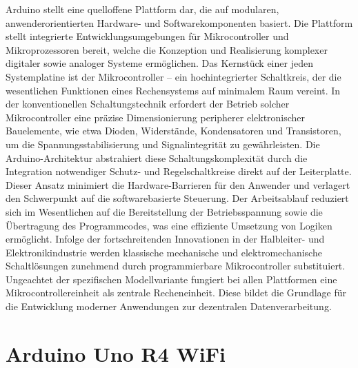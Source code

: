 Arduino stellt eine quelloffene Plattform dar, die auf modularen, anwenderorientierten Hardware- und Softwarekomponenten basiert. Die Plattform stellt integrierte Entwicklungsumgebungen für Mikrocontroller und Mikroprozessoren bereit, welche die Konzeption und Realisierung komplexer digitaler sowie analoger Systeme ermöglichen. Das Kernstück einer jeden Systemplatine ist der Mikrocontroller – ein hochintegrierter Schaltkreis, der die wesentlichen Funktionen eines Rechensystems auf minimalem Raum vereint.
In der konventionellen Schaltungstechnik erfordert der Betrieb solcher Mikrocontroller eine präzise Dimensionierung peripherer elektronischer Bauelemente, wie etwa Dioden, Widerstände, Kondensatoren und Transistoren, um die Spannungsstabilisierung und Signalintegrität zu gewährleisten. Die Arduino-Architektur abstrahiert diese Schaltungskomplexität durch die Integration notwendiger Schutz- und Regelschaltkreise direkt auf der Leiterplatte. Dieser Ansatz minimiert die Hardware-Barrieren für den Anwender und verlagert den Schwerpunkt auf die softwarebasierte Steuerung. Der Arbeitsablauf reduziert sich im Wesentlichen auf die Bereitstellung der Betriebsspannung sowie die Übertragung des Programmcodes, was eine effiziente Umsetzung von Logiken ermöglicht.
Infolge der fortschreitenden Innovationen in der Halbleiter- und Elektronikindustrie werden klassische mechanische und elektromechanische Schaltlösungen zunehmend durch programmierbare Mikrocontroller substituiert. Ungeachtet der spezifischen Modellvariante fungiert bei allen Plattformen eine Mikrocontrollereinheit als zentrale Recheneinheit. Diese bildet die Grundlage für die Entwicklung moderner Anwendungen zur dezentralen Datenverarbeitung. \cite{Arduino:2022}

\section{Arduino Uno R4 WiFi}

